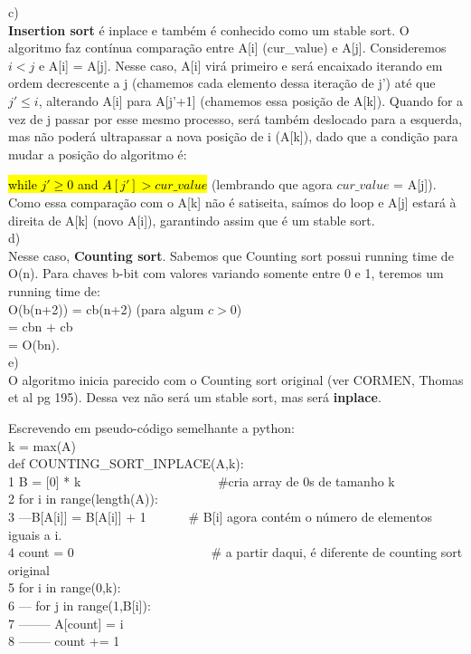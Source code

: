 \documentclass{article}
\begin{document}
c) \\
\textbf{Insertion sort} é inplace e também é conhecido como um stable sort. O algoritmo faz contínua comparação entre A[i] (cur\_value) e A[j]. Consideremos $i < j$ e A[i] = A[j]. Nesse caso, A[i] virá primeiro e será encaixado iterando em ordem decrescente a j (chamemos cada elemento dessa iteração de j') até que $j'\leq i$, alterando A[i] para A[j'+1] (chamemos essa posição de A[k]). Quando for a vez de j passar por esse mesmo processo, será também deslocado para a esquerda, mas não poderá ultrapassar a nova posição de i  (A[k]), dado que a condição para mudar a posição do algoritmo é: 

\hl{while $j' \geq 0$ and $A[j'] > cur\_value$} (lembrando que agora $cur\_value$ = A[j]).\\

Como essa comparação com o A[k] não é satiseita, saímos do loop e A[j] estará à direita de A[k] (novo A[i]), garantindo assim que é um stable sort.
\\


d) \\
Nesse caso, \textbf{Counting sort}. Sabemos que Counting sort possui running time de O(n). Para chaves b-bit com valores variando somente entre 0 e 1, teremos um running time de:\\
O(b(n+2)) = cb(n+2) (para algum $c>0$) \\
= cbn + cb\\
= O(bn).
\\

e)\\
O algoritmo inicia parecido com o Counting sort original (ver CORMEN, Thomas et al pg 195). Dessa vez não será um stable sort, mas será \textbf{inplace}.

Escrevendo em pseudo-código semelhante a python:\\

k = max(A)\\

def COUNTING\_SORT\_INPLACE(A,k):\\
1 B = [0] * k
 \ \ \ \ \ \ \ \ \ \ \ \ \ \ \ \ \ \ \ \ \ \#cria array de 0s de tamanho k\\
2 for i in range(length(A)):\\
3 ---\-B[A[i]] = B[A[i]] + 1 
 \ \ \ \ \ \ \# B[i] agora contém o número de elementos iguais a i.\\
4 count = 0
 \ \ \ \ \ \ \ \ \ \ \ \ \ \ \ \ \ \ \ \ \ \# a partir daqui, é diferente de counting sort original\\
5 for i in range(0,k):\\
6 ---\- for j in range(1,B[i]):\\
7 -------- A[count] = i\\
8 -------- count += 1\\
\end{document}
